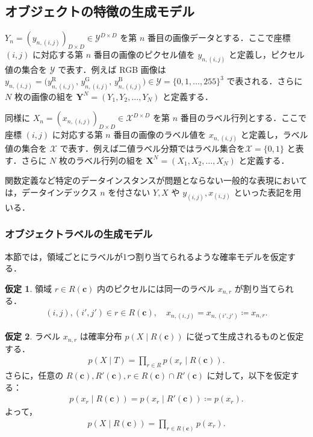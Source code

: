 \documentclass{jsarticle}
\theoremstyle{definition}
\newtheorem{assumption}{仮定}
\begin{document}
\subsection{オブジェクトの特徴の生成モデル}

$Y_n=(y_{n,(i,j)})_{D\times D}\in\mathcal{Y}^{D\times D}$ を第 $n$ 番目の画像データとする．ここで座標 $(i,j)$ に対応する第 $n$ 番目の画像のピクセル値を $y_{n,(i,j)}$ と定義し，ピクセル値の集合を $\mathcal{Y}$ で表す．例えば RGB 画像は$y_{n,(i,j)} = \bigl(y_{n,(i,j)}^{\mathrm{R}},\,y_{n,(i,j)}^{\mathrm{G}},\,y_{n,(i,j)}^{\mathrm{B}}\bigr)
\in \mathcal{Y} = \{0,1,\dots,255\}^3$
で表される．さらに $N$ 枚の画像の組を $\bm{Y}^N=(Y_1,Y_2,\dots,Y_N)$ と定義する．

同様に $X_n=(x_{n,(i,j)})_{D\times D}\in\mathcal{X}^{D\times D}$ を第 $n$ 番目のラベル行列とする．ここで座標 $(i,j)$ に対応する第 $n$ 番目の画像のラベル値を $x_{n,(i,j)}$ と定義し，ラベル値の集合を $\mathcal{X}$ で表す．例えば二値ラベル分類ではラベル集合を$\mathcal{X} = \{0,1\}$
と表す．さらに $N$ 枚のラベル行列の組を $\bm{X}^N=(X_1,X_2,\dots,X_N)$ と定義する．

関数定義など特定のデータインスタンスが問題とならない一般的な表現においては，データインデックス $n$ を付さない $Y,X$ や $y_{(i,j)},x_{(i,j)}$ といった表記を用いる．

\subsubsection{オブジェクトラベルの生成モデル}


本節では，領域ごとにラベルが1つ割り当てられるような確率モデルを仮定する．

\begin{assumption}
  領域 $r\in R(\bm{c})$ 内のピクセルには同一のラベル $x_{n,r}$ が割り当てられる．
  \begin{eqnarray}
    (i,j),(i',j')\in r\in R(\bm{c}),\quad x_{n,(i,j)}=x_{n,(i',j')}\coloneqq x_{n,r}.
  \end{eqnarray}
\end{assumption}


\begin{assumption}
  ラベル $x_{n,r}$ は確率分布 $p(X\mid R(\bm{c}))$ に従って生成されるものと仮定する．
  \begin{eqnarray}
    p(X\mid T)=\prod_{r\in R}p(x_r\mid R(\bm{c})).
  \end{eqnarray}
  さらに，任意の $R(\bm{c}), R'(\bm{c}), r\in R(\bm{c}) \cap R'(\bm{c})$ に対して，以下を仮定する：
  \begin{eqnarray}
    p(x_r\mid R(\bm{c}))=p(x_r\mid R'(\bm{c}))\coloneqq p(x_r).
  \end{eqnarray}
  よって，
  \begin{align}
    p(X\mid R(\bm{c}))=\prod_{r\in R(\bm{c})}p(x_r).
  \end{align}
\end{assumption}
\end{document}
